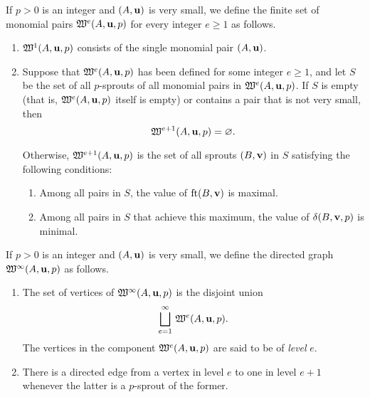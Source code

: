 \documentclass[11pt]{amsart}
\begin{document}


\begin{definition}  If $p>0$ is an integer and $(A, \mathbf{u})$ is very small, we define the finite set of monomial pairs $\mathfrak{W}^e(A, \mathbf{u}, p)$ for every integer $e \geq 1$ as follows.

\begin{enumerate}
\item $\mathfrak{W}^1(A, \mathbf{u}, p)$ consists of the single monomial pair $(A, \mathbf{u})$.
\item Suppose that $\mathfrak{W}^e(A, \mathbf{u}, p)$ has been defined for some integer $e \geq 1$, and let $S$ be the set of all $p$-sprouts of all monomial pairs in $\mathfrak{W}^e(A, \mathbf{u}, p)$.  If  $S$ is empty (that is, $\mathfrak{W}^e(A, \mathbf{u}, p)$ itself is empty) or contains a pair that is not very small, then \[ \mathfrak{W}^{e+1}(A, \mathbf{u}, p) = \varnothing.\]  

Otherwise, $\mathfrak{W}^{e+1}(A, \mathbf{u}, p)$ is the set of all sprouts $(B, \mathbf{v})$ in $S$ satisfying the following conditions:    

\begin{enumerate}
\item Among all pairs in $S$, the value of  $\operatorname{ft}(B, \mathbf{v})$ is maximal.
\item Among all pairs in $S$ that achieve this maximum, the value of $\delta(B, \mathbf{v}, p)$ is minimal.
\end{enumerate}
\end{enumerate}
\end{definition}



\begin{definition}
If $p > 0$ is an integer and $(A, \mathbf{u})$ is very small, we define the directed graph $\mathfrak{W}^{\infty}(A, \mathbf{u}, p)$ as follows.
\begin{enumerate}
\item  The set of vertices of $\mathfrak{W}^{\infty}(A, \mathbf{u}, p)$ is the disjoint union \[ \bigsqcup_{e=1}^{\infty} \, \mathfrak{W}^e(A, \mathbf{u}, p).\]
The vertices in the component $\mathfrak{W}^e(A, \mathbf{u}, p)$ are said to be of \emph{level} $e$.  
\item  There is a directed edge from a vertex in level $e$ to one in level $e+1$ whenever the latter is a $p$-sprout of the former.
\end{enumerate}
\end{definition}
\end{document}
